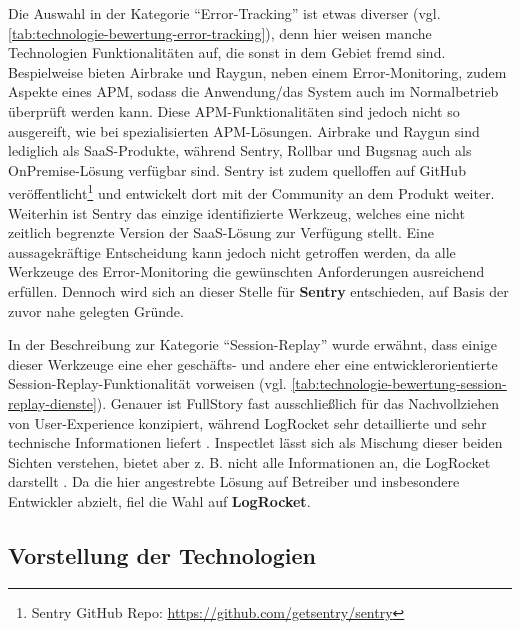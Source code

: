 

Die Auswahl in der Kategorie \enquote{Error-Tracking} ist etwas diverser (vgl. \autoref{tab:technologie-bewertung-error-tracking}), denn hier weisen manche Technologien Funktionalitäten auf, die sonst in dem Gebiet fremd sind. Bespielweise bieten Airbrake und Raygun, neben einem Error-Monitoring, zudem Aspekte eines APM, sodass die Anwendung/das System auch im Normalbetrieb überprüft werden kann. Diese APM-Funktionalitäten sind jedoch nicht so ausgereift, wie bei spezialisierten APM-Lösungen. Airbrake und Raygun sind lediglich als SaaS-Produkte, während Sentry, Rollbar und Bugsnag auch als OnPremise-Lösung verfügbar sind. Sentry ist zudem quelloffen auf GitHub \cite{GitHub} veröffentlicht\footnote{Sentry GitHub Repo: \url{https://github.com/getsentry/sentry}} und entwickelt dort mit der Community an dem Produkt weiter. Weiterhin ist Sentry das einzige identifizierte Werkzeug, welches eine nicht zeitlich begrenzte Version der SaaS-Lösung zur Verfügung stellt. Eine aussagekräftige Entscheidung kann jedoch nicht getroffen werden, da alle Werkzeuge des Error-Monitoring die gewünschten Anforderungen ausreichend erfüllen. Dennoch wird sich an dieser Stelle für \textbf{Sentry} entschieden, auf Basis der zuvor nahe gelegten Gründe.



In der Beschreibung zur Kategorie \enquote{Session-Replay} wurde erwähnt, dass einige dieser Werkzeuge eine eher geschäfts- und andere eher eine entwicklerorientierte Session-Replay-Funktionalität vorweisen (vgl. \autoref{tab:technologie-bewertung-session-replay-dienste}). Genauer ist FullStory fast ausschließlich für das Nachvollziehen von User-Experience konzipiert, während LogRocket sehr detaillierte und sehr technische Informationen liefert \cite{Webalyt}. Inspectlet lässt sich als Mischung dieser beiden Sichten verstehen, bietet aber z. B. nicht alle Informationen an, die LogRocket darstellt  \cite{Webalyt}. Da die hier angestrebte Lösung auf Betreiber und insbesondere Entwickler abzielt, fiel die Wahl auf \textbf{LogRocket}.



\subsection{Vorstellung der Technologien}

